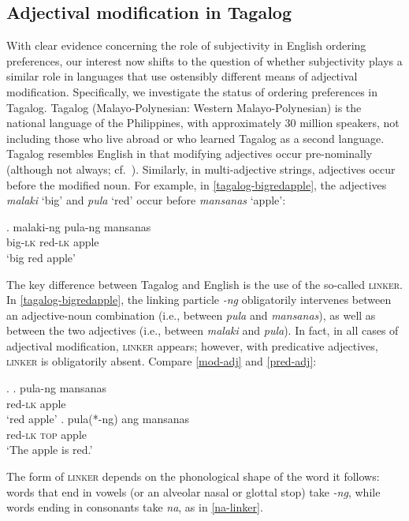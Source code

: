 \documentclass[12pt,letterpaper]{article}
\begin{document}
\subsection{Adjectival modification in Tagalog}

With clear evidence concerning the role of subjectivity in English ordering preferences, our interest now shifts to the question of whether subjectivity plays a similar role in languages that use ostensibly different means of adjectival modification. Specifically, we investigate the status of ordering preferences in Tagalog. Tagalog (Malayo-Polynesian: Western Malayo-Polynesian) is the national language of the Philippines, with approximately 30 million speakers, not including those who live abroad or who learned Tagalog as a second language. Tagalog resembles English in that modifying adjectives occur pre-nominally (although not always; cf.~\citealp{schachterotanes1972,rubin1994,shihzuraw2017}). Similarly, in multi-adjective strings, adjectives occur before the modified noun. For example, in \ref{tagalog-bigredapple}, the adjectives \emph{malaki} `big' and \emph{pula} `red' occur before \emph{mansanas} `apple':

\exg. malaki-ng pula-ng mansanas\\
big-\textsc{lk} red-\textsc{lk} apple\\
`big red apple' \label{tagalog-bigredapple}


The key difference between Tagalog and English is the use of the so-called \textsc{linker}. In \ref{tagalog-bigredapple}, the linking particle \emph{-ng} obligatorily intervenes between an adjective-noun combination (i.e., between \emph{pula} and \emph{mansanas}), as well as between the two adjectives (i.e., between \emph{malaki} and \emph{pula}). In fact, in all cases of adjectival modification, \textsc{linker} appears; however, with predicative adjectives, \textsc{linker} is obligatorily absent. Compare \ref{mod-adj} and \ref{pred-adj}:

\ex. \ag. pula-ng mansanas\\
red-\textsc{lk} apple\\
`red apple' \label{mod-adj}
\bg. pula(*-ng) ang mansanas\\
red-\textsc{lk} \textsc{top} apple\\
`The apple is red.' \label{pred-adj}

The form of \textsc{linker} depends on the phonological shape of the word it follows: words that end in vowels (or an alveolar nasal or glottal stop) take \emph{-ng}, while words ending in consonants take \emph{na}, as in \ref{na-linker}.
\end{document}
